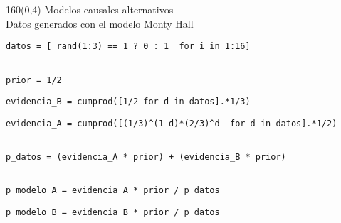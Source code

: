 \documentclass[shownotes,aspectratio=169]{beamer}
\begin{document}
\begin{frame}
\begin{textblock}{160}(0,4)
\centering \LARGE Modelos causales alternativos \\
\Large Datos generados con el modelo Monty Hall
\end{textblock}
\vspace{1cm}


\begin{lstlisting}[belowskip=-0.6 \baselineskip]
datos = [ rand(1:3) == 1 ? 0 : 1  for i in 1:16]
\end{lstlisting}
\pause
\begin{lstlisting}[belowskip=-0.6 \baselineskip]

prior = 1/2
\end{lstlisting}
\pause
\begin{lstlisting}[belowskip=-0.6 \baselineskip]
evidencia_B = cumprod([1/2 for d in datos].*1/3)
\end{lstlisting}
\pause
\begin{lstlisting}[belowskip=-0.6 \baselineskip]
evidencia_A = cumprod([(1/3)^(1-d)*(2/3)^d  for d in datos].*1/2)
\end{lstlisting}
\pause
\begin{lstlisting}[belowskip=-0.6 \baselineskip]

p_datos = (evidencia_A * prior) + (evidencia_B * prior)
\end{lstlisting}
\pause
\begin{lstlisting}[belowskip=-0.6 \baselineskip]

p_modelo_A = evidencia_A * prior / p_datos
\end{lstlisting}
\pause
\begin{lstlisting}
p_modelo_B = evidencia_B * prior / p_datos
\end{lstlisting}
\end{frame}
\end{document}
